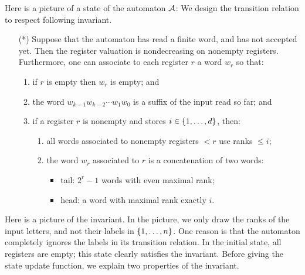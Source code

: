 Here is a picture of a state of the automaton $\mathcal{A}$:
We design the transition relation to respect  following invariant.
\begin{itemize}
	\item[(*)]  Suppose that the automaton has read a finite word, and has not accepted yet. Then the register valuation is nondecreasing on nonempty registers. Furthermore, one can associate to each register $r$ a word $w_r$ so that:
\begin{enumerate} 
\item if $r$ is empty then $w_r$ is empty; and 
	\item the word $w_{k-1} w_{k-2} \cdots w_1 w_0$ is a suffix of the input read so far; and 
	\item if a register $r$ is nonempty and stores $i \in \{1,\ldots,d\}$, then:
	\begin{enumerate}
	\item all words associated to nonempty registers $<r$ use ranks $\le i$;
	\item the word $w_r$ associated to $r$ is a concatenation of two words:
	\begin{itemize} 
	\item {\sc tail:} $2^r - 1$ words with even maximal rank;
	\item {\sc head:}	  a word with maximal rank  exactly $i$.
	\end{itemize}
	\end{enumerate}
\end{enumerate}
\end{itemize}
Here is a picture of the invariant. In the picture, we only draw the ranks of the input letters, and not their labels in $\{1,\ldots,n\}$. One reason is that the automaton completely ignores the labels in its transition relation.   
In the initial state, all registers are empty; this state clearly satisfies the invariant. Before giving the state update function, we  explain two properties of the invariant.



